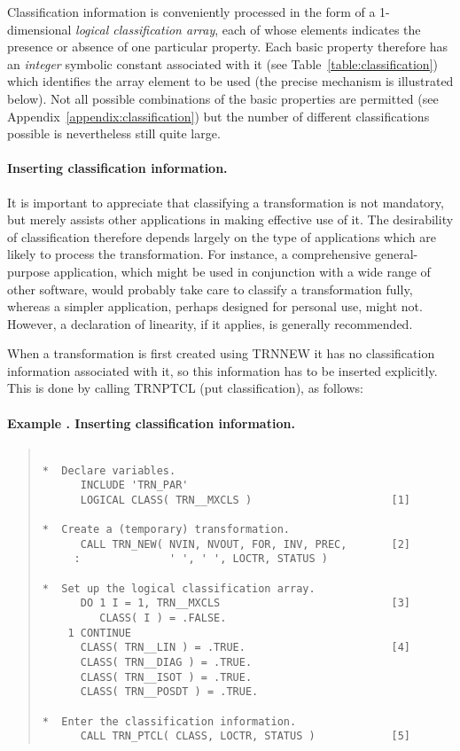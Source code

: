 \documentclass[twoside,11pt]{article}
\renewcommand{\_}{\texttt{\symbol{95}}}
\newcommand{\name}[1]{\mbox{\small{#1}}}
\newcounter{examplecounter}
\newcommand{\example}[1]{\addtocounter{examplecounter}{1}
                         \paragraph{\textbf{Example \theexamplecounter. #1}}}
\begin{document}
Classification information is conveniently processed in the form of a
1-dimensional \emph{logical classification array}, each of whose elements
indicates the presence or absence of one particular property.
Each basic property therefore has an \emph{integer} symbolic constant
associated with it (see Table~\ref{table:classification}) which identifies
the array element to be used (the precise mechanism is illustrated below).
Not all possible combinations of the basic properties are permitted (see
Appendix~\ref{appendix:classification}) but the number of different
classifications possible is nevertheless still quite large.

\paragraph{Inserting classification information.}
It is important to appreciate that classifying a transformation is not
mandatory, but merely assists other applications in making effective
use of it.
The desirability of classification therefore depends largely on the type of
applications which are likely to process the transformation.
For instance, a comprehensive general-purpose application, which might be
used in conjunction with a wide range of other software, would probably take
care to classify a transformation fully, whereas a simpler application,
perhaps designed for personal use, might not.
However, a declaration of linearity, if it applies, is generally
recommended.

When a transformation is first created using \name{TRN\_NEW} it has no
classification information associated with it, so this information has to be
inserted explicitly.
This is done by calling \name{TRN\_PTCL} (put classification), as follows:

\example{Inserting classification information.}

\begin{quote}
\begin{verbatim}

*  Declare variables.
      INCLUDE 'TRN_PAR'
      LOGICAL CLASS( TRN__MXCLS )                      [1]

*  Create a (temporary) transformation.
      CALL TRN_NEW( NVIN, NVOUT, FOR, INV, PREC,       [2]
     :              ' ', ' ', LOCTR, STATUS )

*  Set up the logical classification array.
      DO 1 I = 1, TRN__MXCLS                           [3]
         CLASS( I ) = .FALSE.
    1 CONTINUE
      CLASS( TRN__LIN ) = .TRUE.                       [4]
      CLASS( TRN__DIAG ) = .TRUE.
      CLASS( TRN__ISOT ) = .TRUE.
      CLASS( TRN__POSDT ) = .TRUE.

*  Enter the classification information.
      CALL TRN_PTCL( CLASS, LOCTR, STATUS )            [5]

\end{verbatim}
\end{quote}
\end{document}

